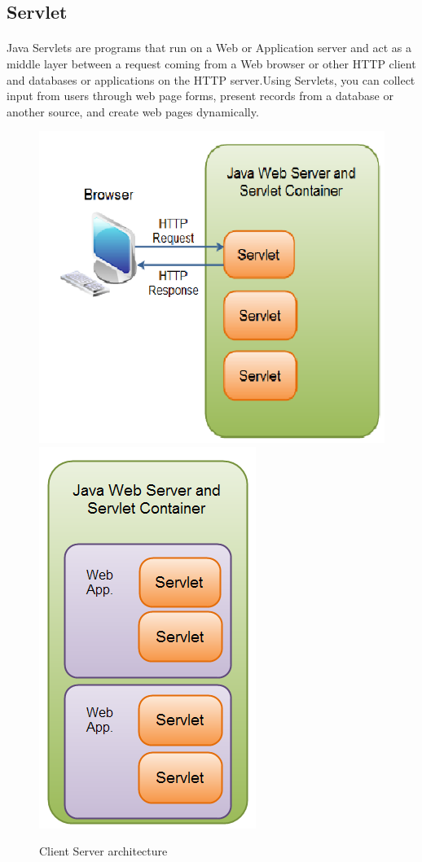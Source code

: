 \documentclass[a4paper,12pt]{article}
\begin{document}
\subsection{Servlet}
\paragraph{}Java Servlets are programs that run on a Web or Application server and act as a middle layer between a request
coming from a Web browser or other HTTP client and databases or applications on the HTTP server.Using
Servlets, you can collect input from users through web page forms, present records from a database or another
source, and create web pages dynamically.

\newpage

\begin{figure}[h!]
  \centering
  {\includegraphics [scale=0.50] {servlet.png}}
  \hfill
  {\includegraphics[scale=0.60]{servlet2.png}}
  \caption{Client Server architecture}
\end{figure}
\end{document}
